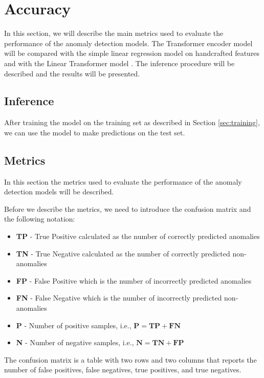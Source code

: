 \documentclass[a4paper, twoside]{report}
\theoremstyle{definition}
\numberwithin{equation}{section}
\begin{document}
\section{Accuracy}


In this section, we will describe the main metrics used to evaluate the performance of the anomaly detection models.
The Transformer encoder model will be compared with the simple linear regression model on handcrafted features
and with the Linear Transformer model \cite{2006.16236}.
The inference procedure will be described and the results will be presented.

\subsection{Inference}
After training the model on the training set as described in Section \ref{sec:training}, we can use the model to make predictions on the test set.

\subsection{Metrics} \label{sec:metrics}

In this section the metrics used to evaluate the performance of the anomaly detection models will be described.

Before we describe the metrics, we need to introduce the confusion matrix and
the following notation:
\begin{itemize}
    \item \textbf{TP} - True Positive calculated as the number of correctly predicted anomalies
    \item \textbf{TN} - True Negative calculated as the number of correctly predicted non-anomalies
    \item \textbf{FP} - False Positive which is the number of incorrectly predicted anomalies
    \item \textbf{FN} - False Negative which is the number of incorrectly predicted non-anomalies
    \item \textbf{P} - Number of positive samples, i.e., $\textbf{P}=\textbf{TP}+\textbf{FN}$
    \item \textbf{N} - Number of negative samples, i.e., $\textbf{N}=\textbf{TN}+\textbf{FP}$
\end{itemize}

The confusion matrix is a table with two rows and two columns that reports the number of false positives, false negatives, true positives, and true negatives.
\end{document}
